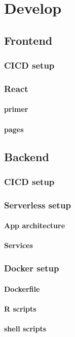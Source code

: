 \documentclass[]{book}
\begin{document}
\chapter{Develop}\label{develop}

\section{Frontend}\label{frontend-1}

\subsection{CICD setup}\label{cicd-setup}

\subsection{React}\label{react}

\subsubsection{primer}\label{primer}

\subsubsection{pages}\label{pages}

\section{Backend}\label{backend-1}

\subsection{CICD setup}\label{cicd-setup-1}

\subsection{Serverless setup}\label{serverless-setup}

\subsubsection{App architecture}\label{app-architecture}

\subsubsection{Services}\label{services}

\subsection{Docker setup}\label{docker-setup}

\subsubsection{Dockerfile}\label{dockerfile}

\subsubsection{R scripts}\label{r-scripts}

\subsubsection{shell scripts}\label{shell-scripts}


\end{document}
